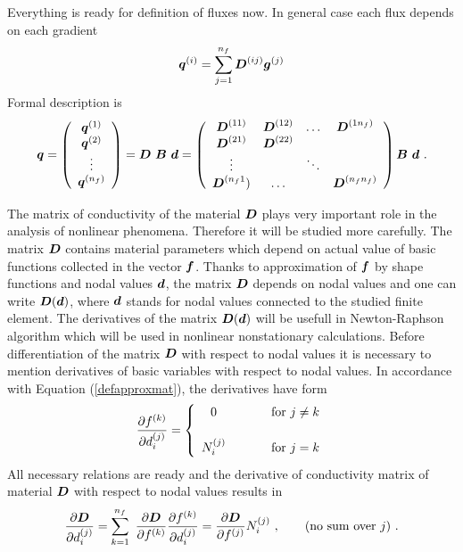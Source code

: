 \documentclass[12pt]{book}
\newcommand{\mbf}[1]{\mbox{\boldmath$#1$}}
\newcommand{\del}[2]{\mbox{$\displaystyle\frac{#1}{#2}$}}
\newcommand{\ppd}[2]{\del{\partial{#1}}{\partial{#2}}}
\begin{document}
Everything is ready for definition of fluxes now. In general case each flux depends
on each gradient
\begin{equation}
\mbf{q}^{(i)} = \sum_{j=1}^{n_f} \mbf{D}^{(ij)} \mbf{g}^{(j)}
\end{equation}
Formal description is
\begin{equation}\label{defcondmatmat}
\mbf{q} = \left(\begin{array}{c}
\mbf{q}^{(1)}
\\
\mbf{q}^{(2)}
\\
\vdots
\\
\mbf{q}^{(n_f)}
\end{array}\right)
= \mbf{D}\ \mbf{B}\ \mbf{d} =
\left(\begin{array}{cccc}
\mbf{D}^{(11)}   & \mbf{D}^{(12)} & \ldots & \mbf{D}^{(1n_f)}
\\
\mbf{D}^{(21)}   & \mbf{D}^{(22)} &        &
\\
\vdots           &                & \ddots &
\\
\mbf{D}^{(n_f1}) & \ldots         &        & \mbf{D}^{(n_fn_f)}
\\
\end{array}\right)
\mbf{B}\ \mbf{d}\ .
\end{equation}

The matrix of conductivity of the material $\mbf{D}$ plays very important role in the analysis of nonlinear phenomena.
Therefore it will be studied more carefully. The matrix $\mbf{D}$ contains material parameters which depend on
actual value of basic functions collected in the vector $\mbf{f}$. Thanks to approximation of $\mbf{f}$ by shape functions
and nodal values $\mbf{d}$, the matrix $\mbf{D}$ depends on nodal values and one can write $\mbf{D}(\mbf{d})$, where
$\mbf{d}$ stands for nodal values connected to the studied finite element. The derivatives of the matrix $\mbf{D}(\mbf{d})$
will be usefull in Newton-Raphson algorithm which will be used in nonlinear nonstationary calculations.
Before differentiation of the matrix $\mbf{D}$ with respect to nodal values it is necessary to mention derivatives
of basic variables with respect to nodal values. In accordance with Equation (\ref{defapproxmat}), the derivatives have form
\begin{eqnarray}\label{defderapprfun}
\ppd{f^{(k)}}{d_i^{(j)}} = \left\{\begin{array}{ccc}
0 & \ \ \ \ \ & {\rm for}\ j \neq k
\\[5mm]
N^{(j)}_{i} & & {\rm for}\ j= k
\end{array}\right.
\end{eqnarray}
All necessary relations are ready and the derivative of conductivity matrix of material $\mbf{D}$ with respect to
nodal values results in
\begin{eqnarray}
\ppd{\mbf{D}}{d_i^{(j)}} = \sum_{k=1}^{n_f}\ \ppd{\mbf{D}}{f^{(k)}} \ppd{f^{(k)}}{d_i^{(j)}} =
\ppd{\mbf{D}}{f^{(j)}} N^{(j)}_{i}\ ,\ \ \ \ \ \ ({\rm no\ sum\ over}\ j)\ .
\end{eqnarray}
\end{document}
